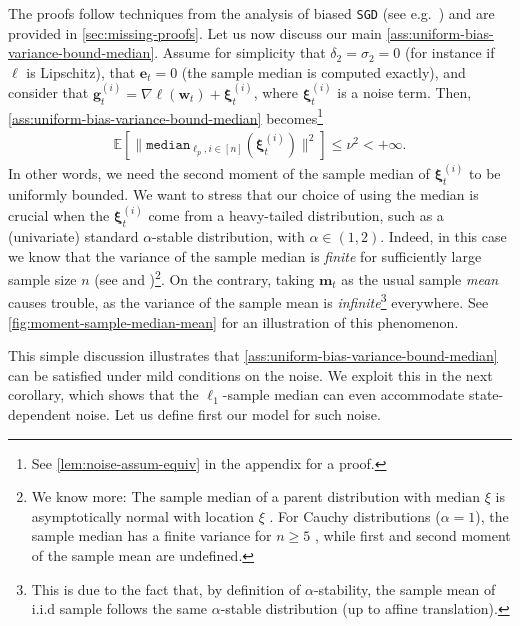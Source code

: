 \documentclass[10pt]{article} %
\renewcommand{\vec}[1]{\bm{#1}}
\newcommand{\E}[1]{\mathbb{E}\left[#1\right] }
\newcommand{\samplemedian}[1]{\texttt{median}_{#1,i\in[n]}}
\newcommand{\SGD}{\texttt{SGD}}
\begin{document}
The proofs follow techniques from the analysis of biased \SGD{} (see e.g.\ \citet{DemMalSokRic23}) and are provided in \cref{sec:missing-proofs}. 
Let us now discuss our main \cref{ass:uniform-bias-variance-bound-median}. Assume for simplicity that $\delta_2=\sigma_2=0$ (for instance if $\ell$ is Lipschitz), that $\vec{e}_t = 0$ (the sample median is computed exactly), and consider that $\vec{g}_t^{(i)} = \nabla \ell(\vec{w}_t) + \vec{\xi}_t^{(i)}$, where $\vec{\xi}_t^{(i)}$ is a noise term. 
Then, \cref{ass:uniform-bias-variance-bound-median}
becomes\footnote{See  \cref{lem:noise-assum-equiv} in the appendix for a proof.} 
\begin{align}\label{eqn:sample-median-noise-cond}
    \E{\|\samplemedian{\ell_p}(\vec{\xi}_t^{(i)})\|^2} \leq \nu^2 < + \infty.
\end{align}
In other words, we need the second moment of the sample median of $\vec{\xi}_t^{(i)}$ to be uniformly bounded.
We want to stress that our choice of using the median is crucial when the $\vec{\xi}_t^{(i)}$ come from a heavy-tailed distribution, such as a (univariate) standard $\alpha$-stable distribution, with $\alpha\in (1,2)$.
Indeed, in this case we know that the variance of the sample median is \emph{finite} for sufficiently large sample size $n$ (see \citet[Theorem 2.2]{Bickel1967} and \citet[Theorem 1.2]{Nolan2020})\footnote{We know more:
The sample median of a parent distribution with median $\xi$ is asymptotically normal with location $\xi$ \citep{Chu1955}. For  Cauchy distributions ($\alpha=1$), the sample median has a finite variance for $n\geq 5$ \citep[Remark 1]{Chu1955}, while first and second moment of the sample mean are undefined.}.
On the contrary, taking $\vec{m}_t$ as the usual sample \emph{mean} causes trouble, as the variance of the sample mean is \emph{infinite}\footnote{This is due to the fact that, by definition of $\alpha$-stability, the sample mean of i.i.d sample follows the same $\alpha$-stable distribution (up to affine translation).} everywhere. 
See  \cref{fig:moment-sample-median-mean} for an illustration of this phenomenon.


This simple discussion illustrates that \cref{ass:uniform-bias-variance-bound-median} can be satisfied under mild conditions on the noise. 
We exploit this in the next corollary, which shows that the $\ell_1$-sample median can even accommodate state-dependent noise. 
Let us define first our model for such noise.
\end{document}
